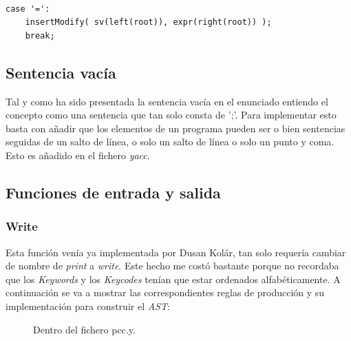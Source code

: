 \documentclass[11pt]{article}
\begin{document}
\begin{verbatim}

case '=':
    insertModify( sv(left(root)), expr(right(root)) );
    break;

\end{verbatim}

\newpage

\subsection{Sentencia vacía}

\noindent Tal y como ha sido presentada la sentencia vacía en el enunciado entiendo el concepto como una sentencia que tan solo consta de ';'. Para implementar esto basta con añadir que los elementos de un programa pueden ser o bien sentencias seguidas de un salto de línea, o solo un salto de línea o solo un punto y coma. Esto es añadido en el fichero \textit{yacc}.


\subsection{Funciones de entrada y salida}

\subsubsection{Write}

\noindent Esta función venía ya implementada por Dusan Kolár, tan solo requería cambiar de nombre de \textit{print} a \textit{write}. Este hecho me costó bastante porque no recordaba que los \textit{Keywords} y los \textit{Keycodes} tenían que estar ordenados alfabéticamente. A continuación se va a mostrar las correspondientes reglas de producción y su implementación para construir el \textit{AST}:

\begin{figure}[H]
  \centering
  \caption{Dentro del fichero pcc.y.}
\end{figure}
\end{document}
